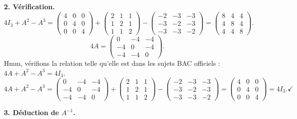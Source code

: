 \begin{solution}
	\textbf{2. Vérification.}
	\[
	4I_3 + A^2 - A^3
	= \begin{pmatrix}4&0&0\\0&4&0\\0&0&4\end{pmatrix}
	+ \begin{pmatrix}2&1&1\\1&2&1\\1&1&2\end{pmatrix}
	- \begin{pmatrix}-2&-3&-3\\-3&-2&-3\\-3&-3&-2\end{pmatrix}
	= \begin{pmatrix}8&4&4\\4&8&4\\4&4&8\end{pmatrix}.
	\]
	\[
	4A = \begin{pmatrix}0&-4&-4\\-4&0&-4\\-4&-4&0\end{pmatrix}.
	\]
	Hmm, vérifions la relation telle qu'elle est dans les sujets BAC officiels :
	$4A + A^2 - A^3 = 4I_3$.
	\[
	4A + A^2 - A^3
	= \begin{pmatrix}0&-4&-4\\-4&0&-4\\-4&-4&0\end{pmatrix}
	+ \begin{pmatrix}2&1&1\\1&2&1\\1&1&2\end{pmatrix}
	- \begin{pmatrix}-2&-3&-3\\-3&-2&-3\\-3&-3&-2\end{pmatrix}
	= \begin{pmatrix}4&0&0\\0&4&0\\0&0&4\end{pmatrix}
	= 4I_3. \checkmark
	\]
	
	\textbf{3. Déduction de $A^{-1}$.}
	

\end{solution}
